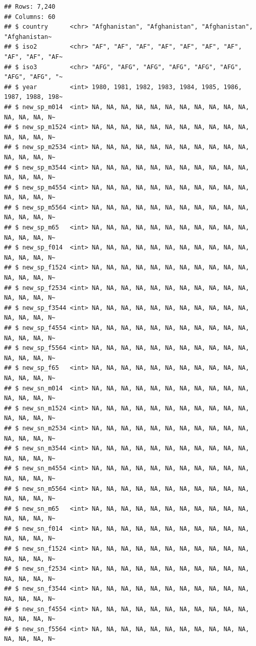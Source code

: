\documentclass[]{tufte-book}
\begin{document}
\begin{verbatim}
## Rows: 7,240
## Columns: 60
## $ country      <chr> "Afghanistan", "Afghanistan", "Afghanistan", "Afghanistan~
## $ iso2         <chr> "AF", "AF", "AF", "AF", "AF", "AF", "AF", "AF", "AF", "AF~
## $ iso3         <chr> "AFG", "AFG", "AFG", "AFG", "AFG", "AFG", "AFG", "AFG", "~
## $ year         <int> 1980, 1981, 1982, 1983, 1984, 1985, 1986, 1987, 1988, 198~
## $ new_sp_m014  <int> NA, NA, NA, NA, NA, NA, NA, NA, NA, NA, NA, NA, NA, NA, N~
## $ new_sp_m1524 <int> NA, NA, NA, NA, NA, NA, NA, NA, NA, NA, NA, NA, NA, NA, N~
## $ new_sp_m2534 <int> NA, NA, NA, NA, NA, NA, NA, NA, NA, NA, NA, NA, NA, NA, N~
## $ new_sp_m3544 <int> NA, NA, NA, NA, NA, NA, NA, NA, NA, NA, NA, NA, NA, NA, N~
## $ new_sp_m4554 <int> NA, NA, NA, NA, NA, NA, NA, NA, NA, NA, NA, NA, NA, NA, N~
## $ new_sp_m5564 <int> NA, NA, NA, NA, NA, NA, NA, NA, NA, NA, NA, NA, NA, NA, N~
## $ new_sp_m65   <int> NA, NA, NA, NA, NA, NA, NA, NA, NA, NA, NA, NA, NA, NA, N~
## $ new_sp_f014  <int> NA, NA, NA, NA, NA, NA, NA, NA, NA, NA, NA, NA, NA, NA, N~
## $ new_sp_f1524 <int> NA, NA, NA, NA, NA, NA, NA, NA, NA, NA, NA, NA, NA, NA, N~
## $ new_sp_f2534 <int> NA, NA, NA, NA, NA, NA, NA, NA, NA, NA, NA, NA, NA, NA, N~
## $ new_sp_f3544 <int> NA, NA, NA, NA, NA, NA, NA, NA, NA, NA, NA, NA, NA, NA, N~
## $ new_sp_f4554 <int> NA, NA, NA, NA, NA, NA, NA, NA, NA, NA, NA, NA, NA, NA, N~
## $ new_sp_f5564 <int> NA, NA, NA, NA, NA, NA, NA, NA, NA, NA, NA, NA, NA, NA, N~
## $ new_sp_f65   <int> NA, NA, NA, NA, NA, NA, NA, NA, NA, NA, NA, NA, NA, NA, N~
## $ new_sn_m014  <int> NA, NA, NA, NA, NA, NA, NA, NA, NA, NA, NA, NA, NA, NA, N~
## $ new_sn_m1524 <int> NA, NA, NA, NA, NA, NA, NA, NA, NA, NA, NA, NA, NA, NA, N~
## $ new_sn_m2534 <int> NA, NA, NA, NA, NA, NA, NA, NA, NA, NA, NA, NA, NA, NA, N~
## $ new_sn_m3544 <int> NA, NA, NA, NA, NA, NA, NA, NA, NA, NA, NA, NA, NA, NA, N~
## $ new_sn_m4554 <int> NA, NA, NA, NA, NA, NA, NA, NA, NA, NA, NA, NA, NA, NA, N~
## $ new_sn_m5564 <int> NA, NA, NA, NA, NA, NA, NA, NA, NA, NA, NA, NA, NA, NA, N~
## $ new_sn_m65   <int> NA, NA, NA, NA, NA, NA, NA, NA, NA, NA, NA, NA, NA, NA, N~
## $ new_sn_f014  <int> NA, NA, NA, NA, NA, NA, NA, NA, NA, NA, NA, NA, NA, NA, N~
## $ new_sn_f1524 <int> NA, NA, NA, NA, NA, NA, NA, NA, NA, NA, NA, NA, NA, NA, N~
## $ new_sn_f2534 <int> NA, NA, NA, NA, NA, NA, NA, NA, NA, NA, NA, NA, NA, NA, N~
## $ new_sn_f3544 <int> NA, NA, NA, NA, NA, NA, NA, NA, NA, NA, NA, NA, NA, NA, N~
## $ new_sn_f4554 <int> NA, NA, NA, NA, NA, NA, NA, NA, NA, NA, NA, NA, NA, NA, N~
## $ new_sn_f5564 <int> NA, NA, NA, NA, NA, NA, NA, NA, NA, NA, NA, NA, NA, NA, N~

\end{verbatim}
\end{document}
